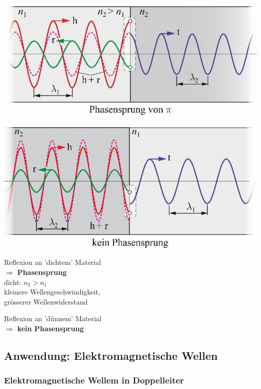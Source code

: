 \begin{minipage}{0.4\linewidth}
\includegraphics[width=0.9\linewidth]{Bilder/Wellen-Optik/reflexion_phasensprung} \\
\end{minipage}
\hfill
\begin{minipage}{0.58\linewidth}
Reflexion an 'dichtem' Material \\
$\Rightarrow$ \textbf{Phasensprung} \\

dicht: $n_2 > n_1$ \\
kleinere Wellengeschwindigkeit,\\
 grösserer Wellenwiderstand \\
\vspace{0.2cm}

Reflexion an 'dünnem' Material\\
$\Rightarrow$ \textbf{kein Phasensprung} \\

\end{minipage}




\subsection{Anwendung: Elektromagnetische Wellen}

\subsubsection{Elektromagnetische Wellem in Doppelleiter}

